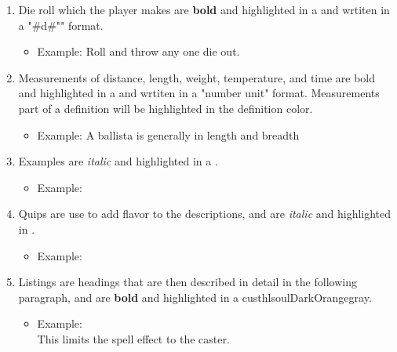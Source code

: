 \begin{enumerate}[leftmargin=12pt]
\item Die roll which the player makes are \textbf{bold} and highlighted in a   and wrtiten in a "\#d\#"" format.
	\begin{itemize}\item Example: Roll  and throw any one die out.\end{itemize}
\item Measurements of distance, length, weight, temperature, and time are bold and highlighted in   a and wrtiten in a "number unit" format. Measurements part of a definition will be highlighted in the definition color.
	\begin{itemize}\item Example: A ballista is generally  in length and breadth\end{itemize}
\item Examples are \textit{italic} and highlighted in a .
	\begin{itemize}\item Example: \end{itemize}
\item Quips are use to add flavor to the descriptions, and are \textit{italic} and highlighted in .
	\begin{itemize}\item Example: \end{itemize}
\item Listings are headings that are then described in detail in the following paragraph, and are \textbf{bold} and highlighted in a custhl{soulDarkOrange}{gray}.
	\begin{itemize}\item Example: \\
This limits the spell effect to the caster.\end{itemize}
\end{enumerate}
